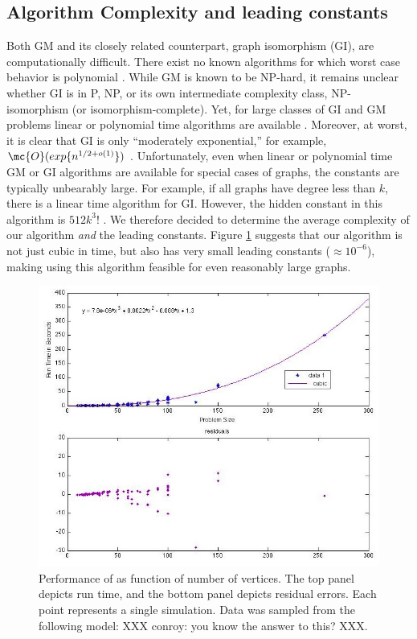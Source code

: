\documentclass[10pt,journal,cspaper,compsoc]{IEEEtran}
\begin{document}


\subsection{Algorithm Complexity and leading constants} %
\label{sub:algorithm_complexity_and_leading_constants}

Both GM and its closely related counterpart, graph isomorphism (GI), are computationally difficult.  There exist no known algorithms for which worst case behavior is polynomial \cite{Fortin96}.  While GM is known to be NP-hard, it remains unclear whether GI is in P, NP, or its own intermediate complexity class, NP-isomorphism (or isomorphism-complete).  Yet, for large classes of GI and GM problems linear or polynomial time algorithms are available \cite{Babai1980}.  Moreover, at worst, it is clear that GI is only ``moderately exponential,'' for example, $\mc{O}(exp\{n^{1/2 + o(1)}\})$ \cite{Babai1981}.  Unfortunately, even when linear or polynomial time GM or GI algorithms are available for special cases of graphs, the constants are typically unbearably large.  For example, if all graphs have degree less than $k$, there is a linear time algorithm for GI.  However, the hidden constant in this algorithm is $512k^3!$ \cite{Chen1994}.  We therefore decided to determine the average complexity of our algorithm \emph{and} the leading constants.  Figure \ref{fig:scaling} suggests that our algorithm is not just cubic in time, but also has very small leading constants ($\approx 10^{-6}$), making using this algorithm feasible for even reasonably large graphs.




\begin{figure}[htbp]
	\centering			
	\includegraphics[width=1.0\linewidth]{../figs/scaling_law.jpg}
	\caption{Performance of \qap as function of number of vertices.  The top panel depicts run time, and the bottom panel depicts residual errors.  Each point represents a single simulation.  Data was sampled from the following model: XXX conroy: you know the answer to this? XXX.}
	\label{fig:scaling}
\end{figure}
\end{document}
